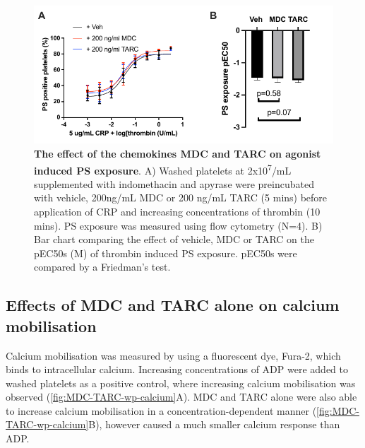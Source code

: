 \documentclass[11pt,twoside]{bristolthesis}
\begin{document}
\begin{figure}

{\centering \includegraphics{figure/Chemokines/Layouts/MDC_TARC_PS_exposure_layout} 

}

\caption[The effect of the chemokines MDC and TARC on agonist induced PS exposure]{\textbf{The effect of the chemokines MDC and TARC on agonist induced PS exposure}. A) Washed platelets at 2x10\textsuperscript{7}/mL supplemented with indomethacin and apyrase were preincubated with vehicle, 200ng/mL MDC or 200 ng/mL TARC (5 mins) before application of CRP and increasing concentrations of thrombin (10 mins). PS exposure was measured using flow cytometry (N=4). B) Bar chart comparing the effect of vehicle, MDC or TARC on the pEC50s (M) of thrombin induced PS exposure. pEC50s were compared by a Friedman's test.}\label{fig:MDC-TARC-PS-exposure}
\end{figure}
\hypertarget{effects-of-mdc-and-tarc-alone-on-calcium-mobilisation}{%
\subsection{Effects of MDC and TARC alone on calcium mobilisation}\label{effects-of-mdc-and-tarc-alone-on-calcium-mobilisation}}

Calcium mobilisation was measured by using a fluorescent dye, Fura-2, which binds to intracellular calcium. Increasing concentrations of ADP were added to washed platelets as a positive control, where increasing calcium mobilisation was observed (\ref{fig:MDC-TARC-wp-calcium}A). MDC and TARC alone were also able to increase calcium mobilisation in a concentration-dependent manner (\ref{fig:MDC-TARC-wp-calcium}B), however caused a much smaller calcium response than ADP.
\end{document}
